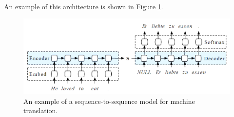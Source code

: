 An example of this architecture is shown in Figure \ref{fig:seq2seq}.
\begin{figure}[ht]
    \centering
    \includegraphics[width=0.8\linewidth]{images/2_1_seq2seq.png}
    \caption{An example of a sequence-to-sequence model for machine translation.}
    \label{fig:seq2seq}
\end{figure}



